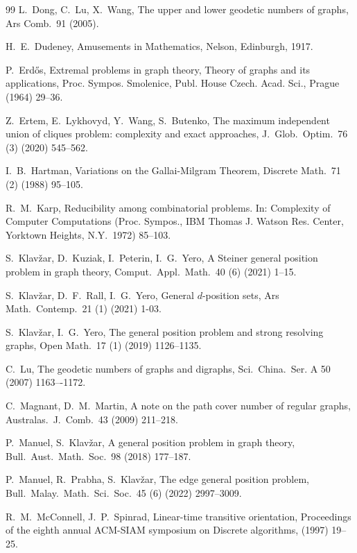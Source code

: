 \documentclass[a4paper,12pt]{article}
\theoremstyle{definition}
\begin{document}
\begin{thebibliography}{99}
		L.~Dong, C.~Lu, X.~Wang, 
		The upper and lower geodetic numbers of graphs, 
		Ars Comb.\ 91 (2005). 
		
		H.~E.~Dudeney, 
		Amusements in Mathematics, 
		Nelson, Edinburgh, 1917. 
		
		P.~Erd\H{o}s, 
		Extremal problems in graph theory, 
		Theory of graphs and its applications, Proc. Sympos. Smolenice, Publ. House Czech. Acad. Sci., Prague (1964) 29--36.
		
		Z.~Ertem, E.~Lykhovyd, Y.~Wang, S.~Butenko,
		The maximum independent union of cliques problem: complexity and exact approaches, 
		J.\ Glob.\ Optim.\ 76 (3) (2020) 545--562.
		
		I.~B.~Hartman, 
		Variations on the Gallai-Milgram Theorem, 
		Discrete Math.\ 71 (2) (1988) 95--105.
		
		R.~M.~Karp,
		Reducibility among combinatorial problems. In: Complexity of Computer Computations ({P}roc. {S}ympos., {IBM} {T}homas {J}. {W}atson {R}es. {C}enter, {Y}orktown {H}eights, {N}.{Y}.\ 1972) 85--103.
		
		S.~Klav\v zar, D.~Kuziak, I.~Peterin, I.~G.~Yero, 
		A Steiner general position problem in graph theory, Comput.\ Appl.\ Math.\ 40 (6) (2021) 1--15.
		
		S.~Klav\v zar, D.~F.~Rall, I.~G.~Yero, 
		General $d$-position sets, Ars Math.\ Contemp.\ 21 (1) (2021) 1-03.
		
		S.~Klav\v{z}ar, I.~G.~Yero, 
		The general position problem and strong resolving graphs, 
		Open Math.\ 17 (1) (2019) 1126--1135.
		
		C.~Lu, 
		The geodetic numbers of graphs and digraphs, 
		Sci.\ China.\ Ser. A 50 (2007) 1163–-1172.
		
		C.~Magnant, D.~M.~Martin,
		A note on the path cover number of regular graphs,
		Australas.\ J.\ Comb.\ 43 (2009) 211--218.
		
		P.~Manuel, S.~Klav\v{z}ar, 
		A general position problem in graph theory, 
		Bull.\ Aust.\ Math.\ Soc.\ 98 (2018) 177--187. 
		
		P.~Manuel, R.~Prabha, S.~Klav\v{z}ar,
		The edge general position problem,
		Bull.\ Malay.\ Math.\ Sci.\ Soc.\ 45 (6) (2022) 2997--3009.
		
		R.~M.~McConnell, J.~P.~Spinrad, 
		Linear-time transitive orientation, 
		Proceedings of the eighth annual ACM-SIAM symposium on Discrete algorithms, (1997) 19--25. 
		

\end{thebibliography}
\end{document}
